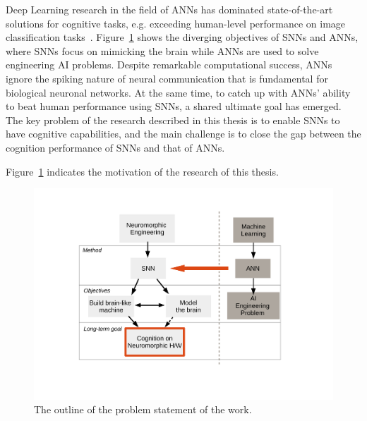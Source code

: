 Deep Learning research in the field of ANNs has dominated state-of-the-art solutions for cognitive tasks, e.g. exceeding human-level performance on image classification tasks~\cite{he2015delving}.
Figure~\ref{fig:intro} shows the diverging objectives of SNNs and ANNs, where SNNs focus on mimicking the brain while ANNs are used to solve engineering AI problems.
Despite remarkable computational success, ANNs ignore the spiking nature of neural communication that is fundamental for biological neuronal networks.
At the same time, to catch up with ANNs' ability to beat human performance using SNNs, a shared ultimate goal has emerged.
The key problem of the research described in this thesis is to enable SNNs to have cognitive capabilities, and the main challenge is to close the gap between the cognition performance of SNNs and that of ANNs.

Figure~\ref{fig:intro} indicates the motivation of the research of this thesis.

\begin{figure}[tbh!]
	\centering
	\includegraphics[width=1.0\textwidth]{pics_intro/intro2.pdf}
	\caption{
		The outline of the problem statement of the work.
	}
	\label{fig:intro}
\end{figure}




